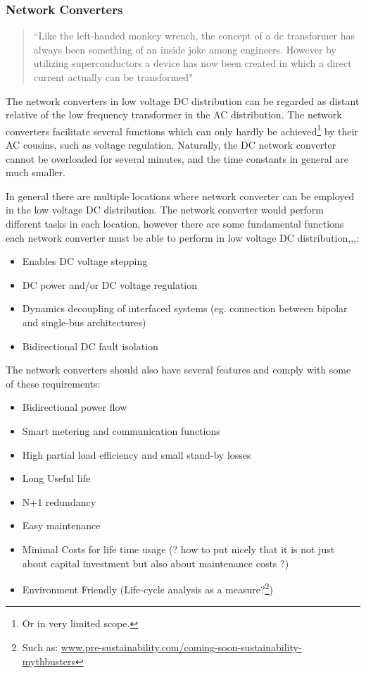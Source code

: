 \documentclass[]{scrartcl}
\begin{document}
 

\subsubsection{Network Converters}

\begin{quotation}
	``Like the left-handed monkey wrench, the concept of a dc transformer has always been something of an inside joke among engineers. However by utilizing superconductors a device has now been created in which a direct current actually can be transformed" \cite{Although}
\end{quotation}

The network converters in low voltage DC distribution can be regarded as distant relative of the low frequency transformer in the AC distribution. The network converters facilitate several functions which can only hardly be achieved\footnote{Or in very limited scope.} by their AC cousins, such as voltage regulation. Naturally, the DC network converter cannot be overloaded for several minutes, and the time constants in general are much smaller. 

In general there are multiple locations where network converter can be employed in the low voltage DC distribution. The network converter would perform different tasks in each location, however there are some fundamental functions each network converter must be able to perform in low voltage DC distribution\cite{Dong2013},\cite{Doncker2014},\cite{FeasibilityofDCtransmissionnetworks},\cite{Jovcic2014}:
\begin{itemize}
	\item Enables DC voltage stepping
	\item DC power and/or DC voltage regulation
	\item Dynamics decoupling of interfaced systems (eg. connection between bipolar and single-bus architectures)
	\item Bidirectional DC fault isolation
\end{itemize}

The network converters should also have several features and comply with some of these requirements:
\begin{itemize}
	\item Bidirectional power flow
	\item Smart metering and communication functions \cite{Liserre2016}
	\item High partial load efficiency and small stand-by losses
	\item Long Useful life
	\item N+1 redundancy
	\item Easy maintenance 
	\item Minimal Costs for life time usage (? how to put nicely that it is not just about capital investment but also about maintenance costs ?)
	\item Environment Friendly (Life-cycle analysis as a measure?\footnote{Such as: \href{https://www.pre-sustainability.com/electric-vehicles-are-best-for-green-mobility-myth-or-not}{www.pre-sustainability.com/coming-soon-sustainability-mythbusters}})
\end{itemize}
\end{document}
